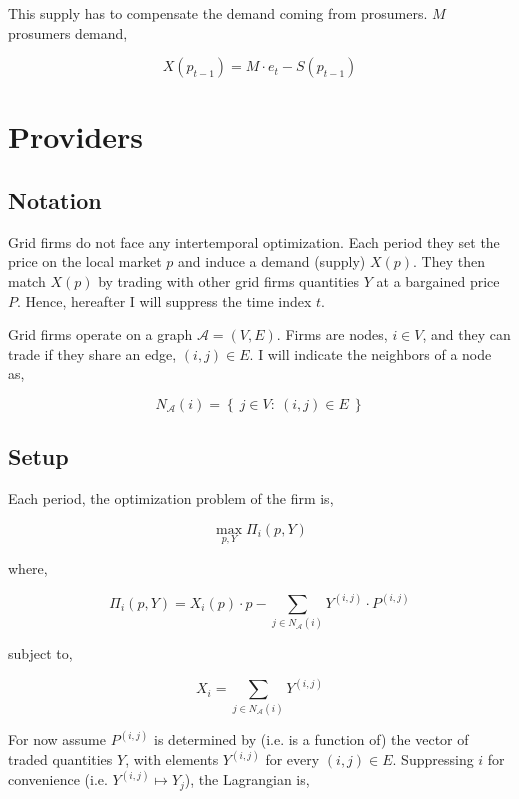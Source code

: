 \documentclass[american]{scrartcl}
\newcommand{\set}[1]{\left\{#1\right\}}
\begin{document}
This supply has to compensate the demand coming from prosumers. $M$ prosumers demand,

\begin{equation}
	X(p_{t-1}) = M \cdot e_t - S(p_{t-1})
\end{equation}

\section{Providers}

\subsection{Notation}

Grid firms do not face any intertemporal optimization. Each period they set the price on the local market $p$ and induce a demand (supply) $X(p)$. They then match $X(p)$ by trading with other grid firms quantities $Y$ at a bargained price $P$. Hence, hereafter I will suppress the time index $t$.

Grid firms operate on a graph $\mathcal{A} = (V, E)$. Firms are nodes, $i \in V$, and they can trade if they share an edge, $(i, j) \in E$. I will indicate the neighbors of a node as,

\begin{equation}
	N_{\mathcal{A}}(i) = \set{ \ j \in V: \ (i, j) \in E \ }
\end{equation}

\subsection{Setup}

Each period, the optimization problem of the firm is,

\begin{equation}
	\max_{p, Y} \Pi_i(p, Y)
\end{equation}

where,

\begin{equation}
	\Pi_i\left(p, Y\right) = X_i(p) \cdot p - \sum_{j \in N_{\mathcal{A}}(i)} Y^{(i, j)} \cdot P^{(i, j)}
\end{equation}

subject to,

\begin{equation}
	X_i=  \sum_{j \in N_{\mathcal{A}}(i)} Y^{(i, j)}
\end{equation}

For now assume $P^{(i, j)}$ is determined by (i.e. is a function of) the vector of traded quantities $Y$, with elements $Y^{(i, j)}$ for every $(i, j) \in E$. Suppressing $i$ for convenience (i.e. $Y^{(i, j)} \mapsto Y_j$), the Lagrangian is,
\end{document}
